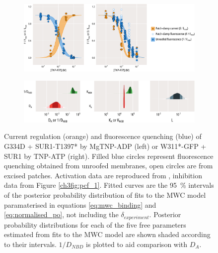 \begin{figure}[h]
	\centering
	\begin{subfigure}[t]{0.9\textwidth}
		\caption{}\label{ch7fig:activation_fit_1}
		\centering
		\includegraphics[width=\textwidth]{activation_fit_1.pdf}
	\end{subfigure}
	\vfill
	\begin{subfigure}[t]{0.9\textwidth}
		\caption{}\label{ch7fig:activation_params_1}
		\centering
		\includegraphics[width=\textwidth]{activation_params_1.pdf}
	\end{subfigure}
	\caption[TNP-ATP inhibits K\ATP{} more strongly than MgTNP-ADP activates it]{
	 Current regulation (orange) and fluorescence quenching (blue) of G334D + SUR1-T1397* by MgTNP-ADP (left) or W311*-GFP + SUR1 by TNP-ATP (right).
	Filled blue circles represent fluorescence quenching obtained from unroofed membranes, open circles are from excised patches.
	Activation data are reproduced from \citeauthor{puljung_activation_2019}, inhibition data from Figure \ref{ch3fig:pcf_1}.
	Fitted curves are the \SI{95}{\percent} intervals of the posterior probability distribution of fits to the MWC model paramaterised in equations \ref{eq:mwc_binding} and \ref{eq:normalised_po}, not including the $\delta_{experiment}$.
	 Posterior probability distributions for each of the five free parameters estimated from fits to the MWC model are shown shaded according to their intervals.
	$1/D_{NBD}$ is plotted to aid comparison with $D_A$.
	}\label{ch7fig:activation_fits}
\end{figure}

